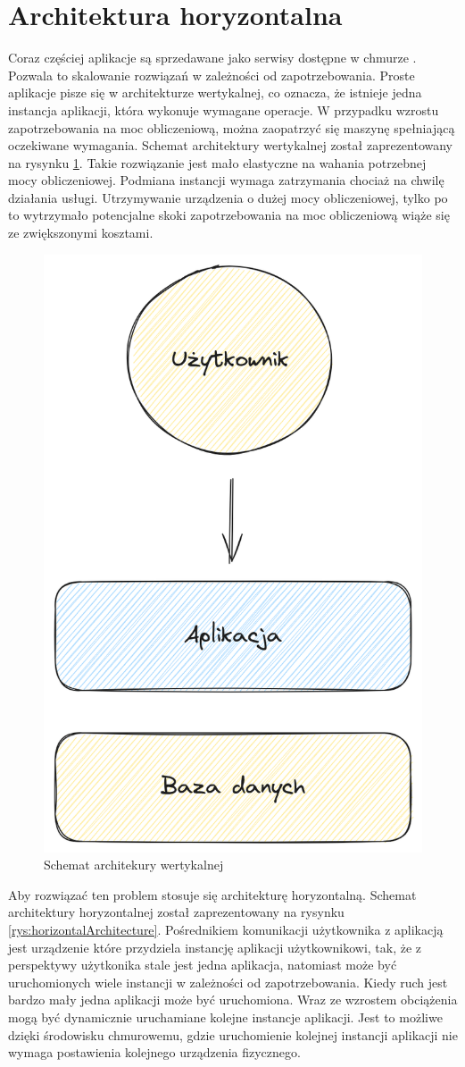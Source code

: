 \section{Architektura horyzontalna}

Coraz częściej aplikacje są sprzedawane jako serwisy dostępne w chmurze \cite{horizontalArchitecture}.
Pozwala to skalowanie rozwiązań w zależności od zapotrzebowania.
Proste aplikacje pisze się w architekturze wertykalnej, co oznacza, że istnieje jedna instancja aplikacji, która wykonuje wymagane operacje.
W przypadku wzrostu zapotrzebowania na moc obliczeniową, można zaopatrzyć się maszynę spełniającą oczekiwane wymagania.
Schemat architektury wertykalnej został zaprezentowany na rysynku \ref{rys:veriticalArchitecture}.
Takie rozwiązanie jest mało elastyczne na wahania potrzebnej mocy obliczeniowej.
Podmiana instancji wymaga zatrzymania chociaż na chwilę działania usługi.
Utrzymywanie urządzenia o dużej mocy obliczeniowej, tylko po to wytrzymało potencjalne skoki zapotrzebowania na moc obliczeniową wiąże się ze zwiększonymi kosztami.

\begin{figure}[!hb]
	\centering \includegraphics[width=0.5\linewidth]{rysunki/vertical_archtecture.png}
	\caption{Schemat architekury wertykalnej}
	\label{rys:veriticalArchitecture}
\end{figure}


Aby rozwiązać ten problem stosuje się architekturę horyzontalną.
Schemat architektury horyzontalnej został zaprezentowany na rysynku \ref{rys:horizontalArchitecture}.
Pośrednikiem komunikacji użytkownika z aplikacją jest urządzenie które przydziela instancję aplikacji użytkownikowi, tak, że z perspektywy użytkonika stale jest jedna aplikacja, natomiast może być uruchomionych wiele instancji w zależności od zapotrzebowania.
Kiedy ruch jest bardzo mały jedna aplikacji może być uruchomiona.
Wraz ze wzrostem obciążenia mogą być dynamicznie uruchamiane kolejne instancje aplikacji.
Jest to możliwe dzięki środowisku chmurowemu, gdzie uruchomienie kolejnej instancji aplikacji nie wymaga postawienia kolejnego urządzenia fizycznego.

